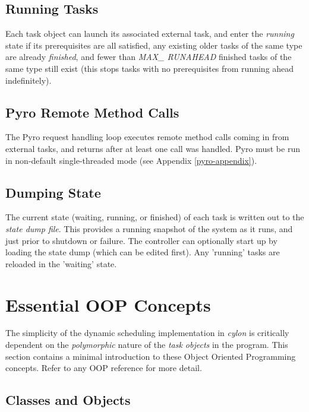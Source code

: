 \documentclass[11pt,a4paper]{article}
\begin{document}
\subsection{Running Tasks}

Each task object can launch its associated external task, and enter the
{\em running} state if its prerequisites are all satisfied, any existing
older tasks of the same type are already {\em finished}, and fewer than
{\em MAX\_ RUNAHEAD} finished tasks of the same type still exist (this
stops tasks with no prerequisites from running ahead indefinitely).

\subsection{Pyro Remote Method Calls}

The Pyro request handling loop executes remote method calls coming in
from external tasks, and returns after at least one call was handled.
Pyro must be run in non-default single-threaded mode (see Appendix
\ref{pyro-appendix}).

\subsection{Dumping State} 

The current state (waiting, running, or finished) of each task is
written out to the {\em state dump file}.  This provides a running
snapshot of the system as it runs, and just prior to shutdown or
failure. The controller can optionally start up by loading the state
dump (which can be edited first). Any 'running' tasks are reloaded in
the 'waiting' state.

\appendix

\section{Essential OOP Concepts}

The simplicity of the dynamic scheduling implementation in {\em cylon}
is critically dependent on the {\em polymorphic} nature of the {\em task
objects} in the program.  This section contains a minimal introduction
to these Object Oriented Programming concepts.  Refer to any OOP
reference for more detail.

\subsection{Classes and Objects}
\end{document}
